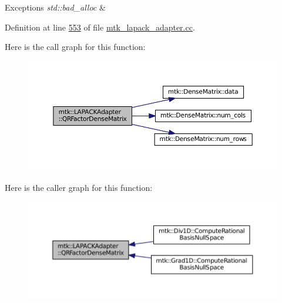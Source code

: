 \begin{DoxyExceptions}{Exceptions}
{\em std\-::bad\-\_\-alloc} & \\
\hline
\end{DoxyExceptions}


Definition at line \hyperlink{mtk__lapack__adapter_8cc_source_l00553}{553} of file \hyperlink{mtk__lapack__adapter_8cc_source}{mtk\-\_\-lapack\-\_\-adapter.\-cc}.



Here is the call graph for this function\-:\nopagebreak
\begin{figure}[H]
\begin{center}
\leavevmode
\includegraphics[width=350pt]{classmtk_1_1LAPACKAdapter_ae5c6e78c9c819c9ac7a6f31bfd011d7a_cgraph}
\end{center}
\end{figure}




Here is the caller graph for this function\-:\nopagebreak
\begin{figure}[H]
\begin{center}
\leavevmode
\includegraphics[width=350pt]{classmtk_1_1LAPACKAdapter_ae5c6e78c9c819c9ac7a6f31bfd011d7a_icgraph}
\end{center}
\end{figure}


